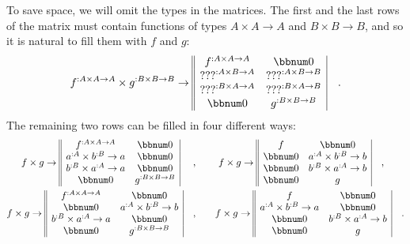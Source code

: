 To save space, we will omit the types in the matrices. The first and
the last rows of the matrix must contain functions of types $A\times A\rightarrow A$
and $B\times B\rightarrow B$, and so it is natural to fill them with
$f$ and $g$:
\[
f^{:A\times A\rightarrow A}\times g^{:B\times B\rightarrow B}\rightarrow\begin{array}{||cc|}
f^{:A\times A\rightarrow A} & \bbnum 0\\
\text{???}^{:A\times B\rightarrow A} & \text{???}^{:A\times B\rightarrow B}\\
\text{???}^{:B\times A\rightarrow A} & \text{???}^{:B\times A\rightarrow B}\\
\bbnum 0 & g^{:B\times B\rightarrow B}
\end{array}\quad.
\]
The remaining two rows can be filled in four different ways:
\begin{align*}
f\times g\rightarrow\begin{array}{||cc|}
f^{:A\times A\rightarrow A} & \bbnum 0\\
a^{:A}\times b^{:B}\rightarrow a & \bbnum 0\\
b^{:B}\times a^{:A}\rightarrow a & \bbnum 0\\
\bbnum 0 & g^{:B\times B\rightarrow B}
\end{array}~\quad,\quad\quad & ~f\times g\rightarrow\begin{array}{||cc|}
f & \bbnum 0\\
\bbnum 0 & a^{:A}\times b^{:B}\rightarrow b\\
\bbnum 0 & b^{:B}\times a^{:A}\rightarrow b\\
\bbnum 0 & g
\end{array}\quad,\\
f\times g\rightarrow\begin{array}{||cc|}
f^{:A\times A\rightarrow A} & \bbnum 0\\
\bbnum 0 & a^{:A}\times b^{:B}\rightarrow b\\
b^{:B}\times a^{:A}\rightarrow a & \bbnum 0\\
\bbnum 0 & g^{:B\times B\rightarrow B}
\end{array}\quad,\quad\quad & f\times g\rightarrow\begin{array}{||cc|}
f & \bbnum 0\\
a^{:A}\times b^{:B}\rightarrow a & \bbnum 0\\
\bbnum 0 & b^{:B}\times a^{:A}\rightarrow b\\
\bbnum 0 & g
\end{array}\quad.
\end{align*}
